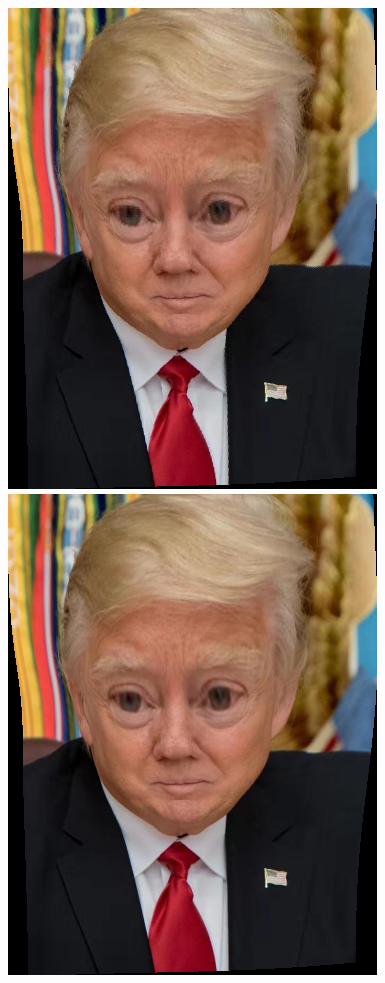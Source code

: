 \documentclass[UTF8]{ctexart}
\begin{document}
\begin{figure}[H]
    \centering
    \includegraphics[scale=0.28]{../images/report-images/8to6nearest.png}
    \includegraphics[scale=0.28]{../images/report-images/8to6bilinear.png}

\end{figure}
\end{document}
